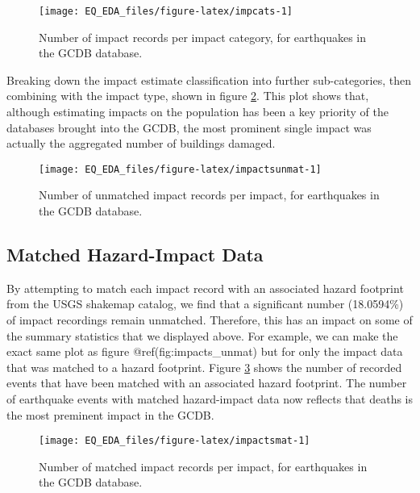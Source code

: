 \documentclass[
]{article}
\begin{document}
\begin{figure}
\texttt{[image: EQ\_EDA\_files/figure-latex/impcats-1]} \caption[Number of impact records per impact category, for earthquakes in the GCDB database]{Number of impact records per impact category, for earthquakes in the GCDB database.}\label{fig:impcats}
\end{figure}

Breaking down the impact estimate classification into further sub-categories, then combining with the impact type, shown in figure \ref{fig:impactsunmat}. This plot shows that, although estimating impacts on the population has been a key priority of the databases brought into the GCDB, the most prominent single impact was actually the aggregated number of buildings damaged.

\begin{figure}
\texttt{[image: EQ\_EDA\_files/figure-latex/impactsunmat-1]} \caption[Number of unmatched impact records per impact, for earthquakes in the GCDB database]{Number of unmatched impact records per impact, for earthquakes in the GCDB database.}\label{fig:impactsunmat}
\end{figure}

\hypertarget{matched-hazard-impact-data}{%
\subsection{Matched Hazard-Impact Data}\label{matched-hazard-impact-data}}

By attempting to match each impact record with an associated hazard footprint from the USGS shakemap catalog, we find that a significant number (18.0594\%) of impact recordings remain unmatched. Therefore, this has an impact on some of the summary statistics that we displayed above. For example, we can make the exact same plot as figure @ref(fig:impacts\_unmat) but for only the impact data that was matched to a hazard footprint. Figure \ref{fig:impactsmat} shows the number of recorded events that have been matched with an associated hazard footprint. The number of earthquake events with matched hazard-impact data now reflects that deaths is the most preminent impact in the GCDB.

\begin{figure}
\texttt{[image: EQ\_EDA\_files/figure-latex/impactsmat-1]} \caption[Number of matched impact records per impact, for earthquakes in the GCDB database]{Number of matched impact records per impact, for earthquakes in the GCDB database.}\label{fig:impactsmat}
\end{figure}
\end{document}
